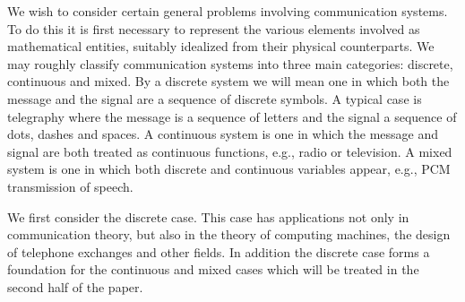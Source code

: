 We wish to consider certain general problems involving communication
systems.  To do this it is first necessary to represent the various elements
involved as mathematical entities, suitably idealized from their physical
counterparts.  We may roughly classify communication systems into three main
categories: discrete, continuous and mixed.  By a discrete system we will
mean one in which both the message and the signal are a sequence of
discrete symbols.  A typical case is telegraphy where the message is a
sequence of letters and the signal a sequence of dots, dashes and
spaces.  A continuous system is one in which the message and signal are
both treated as continuous functions, e.g., radio or television.  A mixed
system is one in which both discrete and continuous variables appear, e.g.,
PCM transmission of speech.

We first consider the discrete case.  This case has applications not only
in communication theory, but also in the theory of computing machines, the
design of telephone exchanges and other fields.  In addition the discrete
case forms a foundation for the continuous and mixed cases which will be
treated in the second half of the paper.

